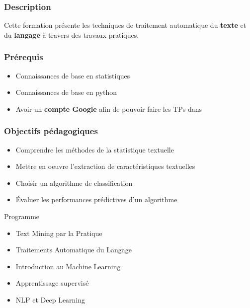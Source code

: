 \begin{frame}
  \frametitle{Description}
  Cette formation présente les techniques de traitement automatique du 
  \textbf{texte} et du \textbf{langage} à travers des travaux pratiques.
\end{frame}

\begin{frame}
  \frametitle{Prérequis}
  \begin{itemize}
  \item Connaissances de base en statistiques
  \item Connaissances de base en python
  \item Avoir un \textbf{compte Google} afin de pouvoir faire les TPs dans 
  \end{itemize}
\end{frame}

\begin{frame}
  \frametitle{Objectifs pédagogiques}
  \begin{itemize}
  \item Comprendre les méthodes de la statistique textuelle
  \item Mettre en oeuvre l'extraction de caractéristiques textuelles
  \item Choisir un algorithme de classification
  \item Évaluer les performances prédictives d'un algorithme
  \end{itemize}
\end{frame}

\begin{frame}{Programme}
  \begin{itemize}
  \item Text Mining par la Pratique
  \item Traitements Automatique du Langage
  \item Introduction au Machine Learning
  \item Apprentissage supervisé
  \item NLP et Deep Learning
  \end{itemize}
\end{frame}
